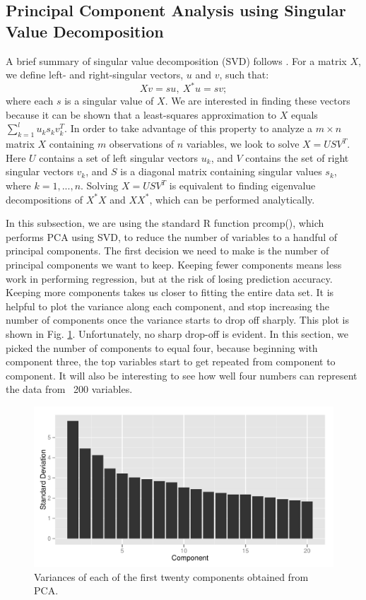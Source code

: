 \subsection{Principal Component Analysis using Singular Value Decomposition}
A brief summary of singular value decomposition (SVD) follows \cite{berrar}. For a matrix $X$, we define left- and right-singular vectors, $u$ and $v$, such that:
\begin{equation}
Xv=su,~X^*u = sv;
\end{equation}
where each $s$ is a singular value of $X$. We are interested in finding these vectors because it can be shown that a least-squares approximation to $X$ equals $\sum_{k=1}^{l}u_ks_kv_k^T$. In order to take advantage of this property to analyze a $m\times n$ matrix $X$ containing $m$ observations of $n$ variables, we look to solve $X = USV^T$. Here $U$ contains a set of left singular vectors $u_k$, and $V$ contains the set of right singular vectors $v_k$, and $S$ is a diagonal matrix containing singular values $s_k$, where $k = 1, ..., n$. Solving $X = USV^T$ is equivalent to finding eigenvalue decompositions of $X^*X$ and $XX^*$, which can be performed analytically. 

In this subsection, we are using the standard R function prcomp(), which performs PCA using SVD, to reduce the number of variables to a handful of principal components. The first decision we need to make is the number of principal components we want to keep. Keeping fewer components means less work in performing regression, but at the risk of losing prediction accuracy. Keeping more components takes us closer to fitting the entire data set. It is helpful to plot the variance along each component, and stop increasing the number of components once the variance starts to drop off sharply. This plot is shown in Fig. \ref{components}. Unfortunately, no sharp drop-off is evident. In this section, we picked the number of components to equal four, because beginning with component three, the top variables start to get repeated from component to component. It will also be interesting to see how well four numbers can represent the data from ~200 variables. 
\begin{figure}
\centering
\includegraphics[scale=0.65]{components.pdf}
\caption{Variances of each of the first twenty components obtained from PCA.}
\label{components}
\end{figure}


